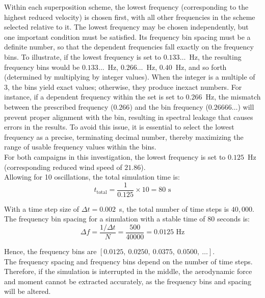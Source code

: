 \documentclass[../main]{subfiles}
\begin{document}
Within each superposition scheme, 
the lowest frequency (corresponding to the highest reduced velocity) is 
chosen first, with all other frequencies in the scheme selected relative to it.
The lowest frequency may be chosen independently, but one important condition must be satisfied. Its frequency bin spacing 
must be a definite number, so that the dependent frequencies fall exactly on the frequency bins.
To illustrate, if the lowest frequency is set to $0.133\dots$~Hz, the resulting frequency bins would be $0.133\dots$~Hz, $0.266\dots$~Hz, $0.40$~Hz, 
and so forth (determined by multiplying by integer values).
When the integer is a multiple of 3, the bins yield exact values; 
otherwise, they produce inexact numbers.
For instance, if a dependent frequency within the set is set to $0.266$~Hz, 
the mismatch between the prescribed frequency ($0.266$) and the bin frequency ($0.26666\dots$) will prevent proper alignment with the bin, 
resulting in spectral leakage that causes errors in the results.
To avoid this issue, it is essential to select the lowest 
frequency as a precise, terminating decimal number, thereby maximizing the range of usable frequency values within the bins.\\

For both campaigns in this investigation, the lowest frequency is set to $0.125$~Hz (corresponding reduced wind speed of $21.86$).\\

Allowing for 10 oscillations, the total simulation time is:
\begin{equation}
    t_{\text{total}} = \frac{1}{0.125} \times 10 = 80 \text{ s}
\end{equation}

With a time step size of $\Delta t = 0.002$~s, the total number of time steps is $40{,}000$.
The frequency bin spacing for a simulation with a stable time of 80 seconds is:
\begin{equation}
    \Delta f = \frac{1/\Delta t}{N} = \frac{500}{40000} = 0.0125 \text{ Hz}
\end{equation}

Hence, the frequency bins are $[0.0125,\ 0.0250,\ 0.0375,\ 0.0500,\ \ldots]$.\\

The frequency spacing and frequency bins depend on the number of time steps.
Therefore, if the simulation is interrupted in the middle, the aerodynamic force and moment cannot be extracted accurately, as the frequency bins and 
spacing will be altered.\\
\end{document}
